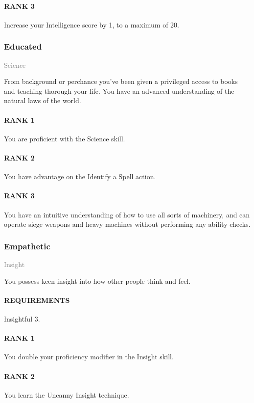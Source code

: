 \paragraph{RANK 3} Increase your Intelligence score by 1, to a maximum of 20.

\subsubsection{Educated} \label{feat::educated}
\small{\textcolor{gray}{Science}}

\normalsize
From background or perchance you've been given a privileged access to books and teaching thorough your life.
You have an advanced understanding of the natural laws of the world.
\paragraph{RANK 1} You are proficient with the Science skill.
\paragraph{RANK 2} You have advantage on the Identify a Spell action.
\paragraph{RANK 3} You have an intuitive understanding of how to use all sorts of machinery, and can operate siege weapons and heavy machines without performing any ability checks.

\subsubsection{Empathetic} \label{feat::empathetic}
\small{\textcolor{gray}{Insight}}

\normalsize
You possess keen insight into how other people think and feel.
\paragraph{REQUIREMENTS} Insightful 3.
\paragraph{RANK 1} You double your proficiency modifier in the Insight skill.
\paragraph{RANK 2} You learn the Uncanny Insight technique.
